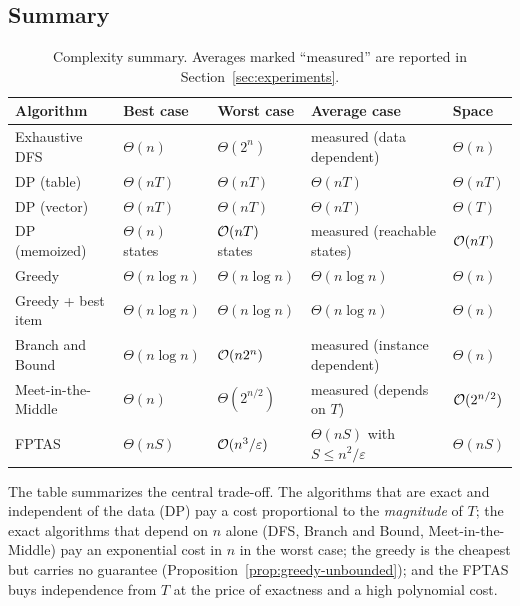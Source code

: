 \subsection{Summary}

\begin{table}[h]
\centering
\caption{Complexity summary. Averages marked ``measured'' are reported in Section~\ref{sec:experiments}.}\label{tab:complexity}
\small
\begin{tabularx}{\linewidth}{@{}l l l X l@{}}
\toprule
Algorithm & Best case & Worst case & Average case & Space\\
\midrule
Exhaustive DFS & $\Theta(n)$ & $\Theta(2^n)$ & measured (data dependent) & $\Theta(n)$\\
DP (table) & $\Theta(nT)$ & $\Theta(nT)$ & $\Theta(nT)$ & $\Theta(nT)$\\
DP (vector) & $\Theta(nT)$ & $\Theta(nT)$ & $\Theta(nT)$ & $\Theta(T)$\\
DP (memoized) & $\Theta(n)$ states & $\mathcal{O}(nT)$ states & measured (reachable states) & $\mathcal{O}(nT)$\\
Greedy & $\Theta(n\log n)$ & $\Theta(n\log n)$ & $\Theta(n\log n)$ & $\Theta(n)$\\
Greedy + best item & $\Theta(n\log n)$ & $\Theta(n\log n)$ & $\Theta(n\log n)$ & $\Theta(n)$\\
Branch and Bound & $\Theta(n\log n)$ & $\mathcal{O}(n2^n)$ & measured (instance dependent) & $\Theta(n)$\\
Meet-in-the-Middle & $\Theta(n)$ & $\Theta(2^{n/2})$ & measured (depends on $T$) & $\mathcal{O}(2^{n/2})$\\
FPTAS & $\Theta(nS)$ & $\mathcal{O}(n^3/\varepsilon)$ & $\Theta(nS)$ with $S\le n^2/\varepsilon$ & $\Theta(nS)$\\
\bottomrule
\end{tabularx}
\end{table}

The table summarizes the central trade-off. The algorithms that are exact and independent of the data (DP) pay a cost proportional to the \emph{magnitude} of $T$; the exact algorithms that depend on $n$ alone (DFS, Branch and Bound, Meet-in-the-Middle) pay an exponential cost in $n$ in the worst case; the greedy is the cheapest but carries no guarantee (Proposition~\ref{prop:greedy-unbounded}); and the FPTAS buys independence from $T$ at the price of exactness and a high polynomial cost.
